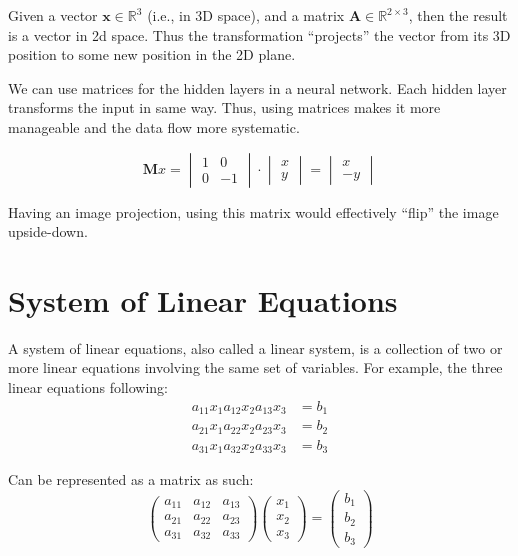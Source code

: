 \begin{example}
	Given a vector $\mathbf{x} \in \mathbb{R}^{3}$ (i.e., in 3D space), and a matrix $\mathbf{A} \in \mathbb{R}^{2 \times 3}$, then the result is a vector in 2d space. Thus the transformation ``projects'' the vector from its 3D position to some new position in the 2D plane.
\end{example}

We can use matrices for the hidden layers in a neural network. Each hidden layer transforms the input in same way. Thus, using matrices makes it more manageable and the data flow more systematic.

\begin{example}
	\begin{equation*}
		\mathbf{M}x = \begin{vmatrix}
			1 & 0  \\
			0 & -1
		\end{vmatrix} \cdot \begin{vmatrix}
			x \\
			y
		\end{vmatrix} = \begin{vmatrix}
			x \\
			-y
		\end{vmatrix}
	\end{equation*}

	Having an image projection, using this matrix would effectively ``flip'' the image upside-down.
\end{example}

\section{System of Linear Equations}%
\label{sec:systemoflinearequations}

A system of linear equations, also called a linear system, is a collection of two or more linear equations involving the same set of variables. For example, the three linear equations following:
\begin{align*}
	a_{11}x_{1}a_{12}x_{2}a_{13}x_{3} & = b_{1} \\
	a_{21}x_{1}a_{22}x_{2}a_{23}x_{3} & = b_{2} \\
	a_{31}x_{1}a_{32}x_{2}a_{33}x_{3} & = b_{3}
\end{align*}

Can be represented as a matrix as such:
\[
	\begin{pmatrix}
		a_{11} & a_{12} & a_{13} \\
		a_{21} & a_{22} & a_{23} \\
		a_{31} & a_{32} & a_{33}
	\end{pmatrix}
	\begin{pmatrix}
		x_1 \\
		x_2 \\
		x_3
	\end{pmatrix}
	=
	\begin{pmatrix}
		b_1 \\
		b_2 \\
		b_3
	\end{pmatrix}
\]

